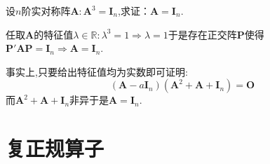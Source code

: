 \begin{brown}
    \begin{example}
        设$n$阶实对称阵$\bm{A}:\bm{A}^3=\bm{I}_n$,求证：$\bm{A}=\bm{I}_n$.
    \end{example}
    \begin{Proof}
        任取$\bm{A}$的特征值$\lambda\in\mathbb{R}:\lambda^3=1\Longrightarrow\lambda=1$于是存在正交阵$\bm{P}$使得$\bm{P}'\bm{AP}=\bm{I}_n\Longrightarrow\bm{A}=\bm{I}_n$.
    \end{Proof}
    事实上,只要给出特征值均为实数即可证明:\[
    \left(
        \bm{A}-a\bm{I}_n
    \right)\left(
        \bm{A}^2+\bm{A}+\bm{I}_n
    \right)=\bm{O}
    \]而$\bm{A}^2+\bm{A}+\bm{I}_n$非异于是$\bm{A}=\bm{I}_n$.
\end{brown}
\newpage
\section{复正规算子}
